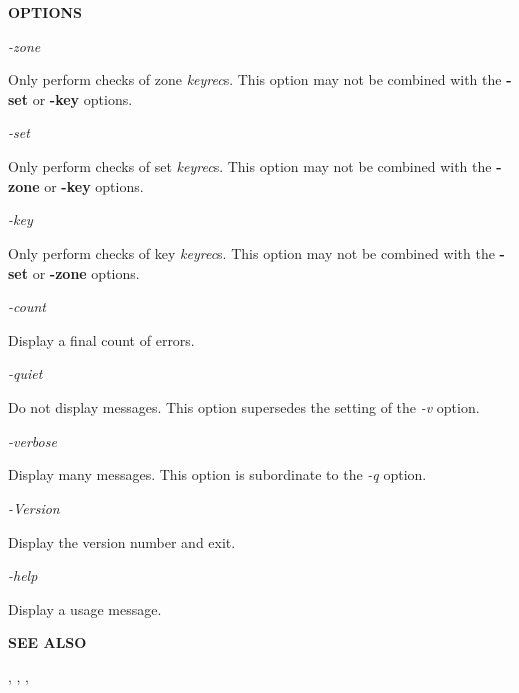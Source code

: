 {\bf OPTIONS}

\begin{description}

\item {\it -zone}\verb" "

Only perform checks of zone {\it keyrec}s.  This option may not be combined
with the {\bf -set} or {\bf -key} options.

\item {\it -set}\verb" "

Only perform checks of set {\it keyrec}s.  This option may not be combined
with the {\bf -zone} or {\bf -key} options.

\item {\it -key}\verb" "

Only perform checks of key {\it keyrec}s.  This option may not be combined
with the {\bf -set} or {\bf -zone} options.

\item {\it -count}\verb" "

Display a final count of errors.

\item {\it -quiet}\verb" "

Do not display messages.  This option supersedes the setting of the {\it -v}
option.

\item {\it -verbose}\verb" "

Display many messages.  This option is subordinate to the {\it -q} option.

\item {\it -Version}\verb" "

Display the  version number and exit.

\item {\it -help}\verb" "

Display a usage message.

\end{description}

{\bf SEE ALSO}

,
,
,


